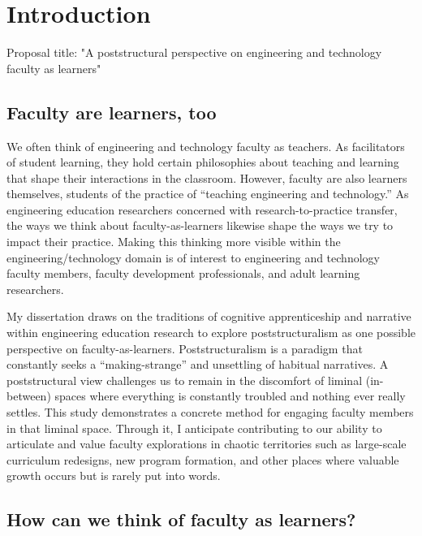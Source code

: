 

\chapter{Introduction}

Proposal title: "A poststructural perspective on engineering and technology faculty as learners"


\section{Faculty are learners, too}

We often think of engineering and technology faculty as teachers. As facilitators of student learning, they hold certain philosophies about teaching and learning that shape their interactions in the classroom. However, faculty are also learners themselves, students of the practice of “teaching engineering and technology.” As engineering education researchers concerned with research-to-practice transfer, the ways we think about faculty-as-learners likewise shape the ways we try to impact their practice. Making this thinking more visible within the engineering/technology domain is of interest to engineering and technology faculty members, faculty development professionals, and adult learning researchers.

My dissertation draws on the traditions of cognitive apprenticeship and narrative within engineering education research to explore poststructuralism as one possible perspective on faculty-as-learners. Poststructuralism is a paradigm that constantly seeks a “making-strange” and unsettling of habitual narratives. A poststructural view challenges us to remain in the discomfort of liminal (in-between) spaces where everything is constantly troubled and nothing ever really settles. This study demonstrates a concrete method for engaging faculty members in that liminal space. Through it, I anticipate contributing to our ability to articulate and value faculty explorations in chaotic territories such as large-scale curriculum redesigns, new program formation, and other places where valuable growth occurs but is rarely put into words.

\section{How can we think of faculty as learners?}


